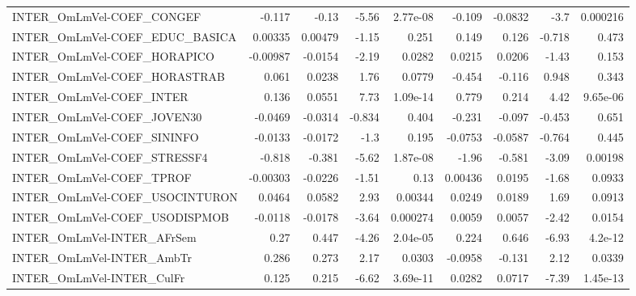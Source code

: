 \begin{tabular}{lrrrrrrrr}
INTER\_OmLmVel-COEF\_CONGEF             &      -0.117 &        -0.13 &   -5.56 & 2.77e-08 &     -0.109 &     -0.0832 &         -3.7 &      0.000216 \\
INTER\_OmLmVel-COEF\_EDUC\_BASICA        &     0.00335 &      0.00479 &   -1.15 &    0.251 &      0.149 &       0.126 &       -0.718 &         0.473 \\
INTER\_OmLmVel-COEF\_HORAPICO           &    -0.00987 &      -0.0154 &   -2.19 &   0.0282 &     0.0215 &      0.0206 &        -1.43 &         0.153 \\
INTER\_OmLmVel-COEF\_HORASTRAB          &       0.061 &       0.0238 &    1.76 &   0.0779 &     -0.454 &      -0.116 &        0.948 &         0.343 \\
INTER\_OmLmVel-COEF\_INTER              &       0.136 &       0.0551 &    7.73 & 1.09e-14 &      0.779 &       0.214 &         4.42 &      9.65e-06 \\
INTER\_OmLmVel-COEF\_JOVEN30            &     -0.0469 &      -0.0314 &  -0.834 &    0.404 &     -0.231 &      -0.097 &       -0.453 &         0.651 \\
INTER\_OmLmVel-COEF\_SININFO            &     -0.0133 &      -0.0172 &    -1.3 &    0.195 &    -0.0753 &     -0.0587 &       -0.764 &         0.445 \\
INTER\_OmLmVel-COEF\_STRESSF4           &      -0.818 &       -0.381 &   -5.62 & 1.87e-08 &      -1.96 &      -0.581 &        -3.09 &       0.00198 \\
INTER\_OmLmVel-COEF\_TPROF              &    -0.00303 &      -0.0226 &   -1.51 &     0.13 &    0.00436 &      0.0195 &        -1.68 &        0.0933 \\
INTER\_OmLmVel-COEF\_USOCINTURON        &      0.0464 &       0.0582 &    2.93 &  0.00344 &     0.0249 &      0.0189 &         1.69 &        0.0913 \\
INTER\_OmLmVel-COEF\_USODISPMOB         &     -0.0118 &      -0.0178 &   -3.64 & 0.000274 &     0.0059 &      0.0057 &        -2.42 &        0.0154 \\
INTER\_OmLmVel-INTER\_AFrSem            &        0.27 &        0.447 &   -4.26 & 2.04e-05 &      0.224 &       0.646 &        -6.93 &       4.2e-12 \\
INTER\_OmLmVel-INTER\_AmbTr             &       0.286 &        0.273 &    2.17 &   0.0303 &    -0.0958 &      -0.131 &         2.12 &        0.0339 \\
INTER\_OmLmVel-INTER\_CulFr             &       0.125 &        0.215 &   -6.62 & 3.69e-11 &     0.0282 &      0.0717 &        -7.39 &      1.45e-13 \\

\end{tabular}

